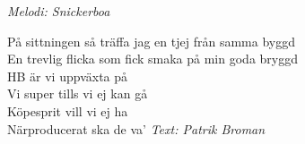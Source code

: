 {\footnotesize\textit{Melodi: Snickerboa}}\par
\vspace{10pt}
\par
På sittningen så träffa jag en tjej från samma byggd\\
En trevlig flicka som fick smaka på min goda bryggd\\
HB är vi uppväxta på\\
Vi super tills vi ej kan gå\\
Köpesprit vill vi ej ha\\
Närproducerat ska de va'
\vspace{10pt}
{\footnotesize\textit{Text: Patrik Broman}}
